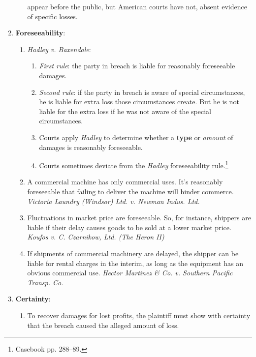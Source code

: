 \begin{enumerate}
\begin{enumerate}
        appear before the public, but American courts have not, absent 
        evidence of specific losses.
    \end{enumerate}
    \item \textbf{Foreseeability}:
    \begin{enumerate}
        \item \emph{Hadley v. Baxendale}:
        \begin{enumerate}
            \item \emph{First rule}: the party in breach is liable for 
            reasonably foreseeable damages.
            \item \emph{Second rule}: if the party in breach is aware of 
            special circumstances, he is liable for extra loss those 
            circumstances create. But he is not liable for the extra loss if 
            he was not aware of the special circumstances.
            \item Courts apply \emph{Hadley} to determine whether a 
            \textbf{type} or \emph{amount} of damages is reasonably 
            foreseeable.
            \item Courts sometimes deviate from the \emph{Hadley} 
            foreseeability rule.\footnote{Casebook pp. 288--89.}
        \end{enumerate}
        \item A commercial machine has only commercial uses. It's reasonably 
        foreseeable that failing to deliver the machine will hinder commerce. 
        \emph{Victoria Laundry (Windsor) Ltd. v. Newman Indus. Ltd.}
        \item Fluctuations in market price are foreseeable. So, for instance, 
        shippers are liable if their delay causes goods to be sold at a lower 
        market price. \emph{Koufos v. C. Czarnikow, Ltd. (The Heron II)}
        \item If shipments of commercial machinery are delayed, the shipper 
        can be liable for rental charges in the interim, as long as the 
        equipment has an obvious commercial use. \emph{Hector Martinez \& Co. 
        v. Southern Pacific Transp. Co.}
    \end{enumerate}
    \item \textbf{Certainty}:
    \begin{enumerate}
        \item To recover damages for lost profits, the plaintiff must show 
        with certainty that the breach caused the alleged amount of loss. 

\end{enumerate}
\end{enumerate}
